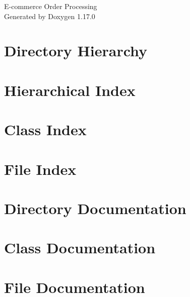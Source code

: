 \documentclass[twoside]{book}
\newcommand{\+}{\discretionary{\mbox{\scriptsize$\hookleftarrow$}}{}{}}
\newcommand{\clearemptydoublepage}{%
    \newpage{\pagestyle{empty}\cleardoublepage}%
  }
\begin{document}
  \raggedbottom
    \hypersetup{pageanchor=false,
                bookmarksnumbered=true,
                pdfencoding=unicode
               }
  \begin{titlepage}
  \vspace*{7cm}
  \begin{center}%
  {\Large E-\/commerce Order Processing}\\
  \vspace*{1cm}
  {\large Generated by Doxygen 1.17.0}\\
  \end{center}
  \end{titlepage}
  \clearemptydoublepage
  \tableofcontents
  \clearemptydoublepage
  \hypersetup{pageanchor=true}
\chapter{Directory Hierarchy}

\chapter{Hierarchical Index}

\chapter{Class Index}

\chapter{File Index}

\chapter{Directory Documentation}


\chapter{Class Documentation}










\chapter{File Documentation}










  \backmatter
  \newpage
  \clearemptydoublepage
  \printindex
\end{document}
